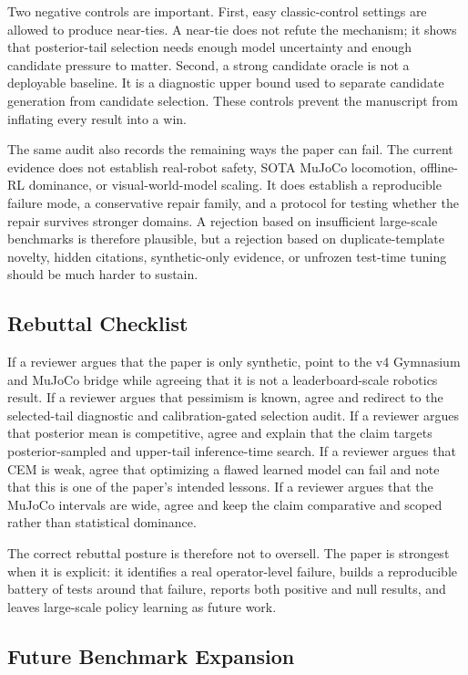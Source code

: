 \documentclass{article}
\begin{document}
Two negative controls are important. First, easy classic-control settings are
allowed to produce near-ties. A near-tie does not refute the mechanism; it
shows that posterior-tail selection needs enough model uncertainty and enough
candidate pressure to matter. Second, a strong candidate oracle is not a
deployable baseline. It is a diagnostic upper bound used to separate candidate
generation from candidate selection. These controls prevent the manuscript
from inflating every result into a win.

The same audit also records the remaining ways the paper can fail. The current
evidence does not establish real-robot safety, SOTA MuJoCo locomotion,
offline-RL dominance, or visual-world-model scaling. It does establish a
reproducible failure mode, a conservative repair family, and a protocol for
testing whether the repair survives stronger domains. A rejection based on
insufficient large-scale benchmarks is therefore plausible, but a rejection
based on duplicate-template novelty, hidden citations, synthetic-only
evidence, or unfrozen test-time tuning should be much harder to sustain.

\subsection{Rebuttal Checklist}

If a reviewer argues that the paper is only synthetic, point to the v4
Gymnasium and MuJoCo bridge while agreeing that it is not a leaderboard-scale
robotics result. If a reviewer argues that pessimism is known, agree and
redirect to the selected-tail diagnostic and calibration-gated selection audit.
If a reviewer argues that posterior mean is competitive, agree and explain
that the claim targets posterior-sampled and upper-tail inference-time search.
If a reviewer argues that CEM is weak, agree that optimizing a flawed learned
model can fail and note that this is one of the paper's intended lessons. If a
reviewer argues that the MuJoCo intervals are wide, agree and keep the claim
comparative and scoped rather than statistical dominance.

The correct rebuttal posture is therefore not to oversell. The paper is
strongest when it is explicit: it identifies a real operator-level failure,
builds a reproducible battery of tests around that failure, reports both
positive and null results, and leaves large-scale policy learning as future
work.

\subsection{Future Benchmark Expansion}
\end{document}
